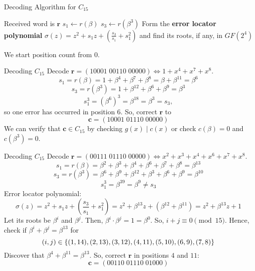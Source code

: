 \begin{algbox}
    \begin{algorithm}[H]
        \DontPrintSemicolon{}
        \caption{Decoding Algorithm for $ C_{15} $}
        Received word is $ \bm{r} $\;
        $ s_1\gets r(\beta) $\;
        $ s_3\gets r(\beta^3) $\;
         {
        }
         {
         {
        }
        }
         {
            \Return{}
        }
        Form the \textbf{error locator polynomial}
        $ \sigma(z)=z^2+s_1z+\left( \frac{s_3}{s_1} +s_1^2 \right) $ and find its
        roots, if any, in $ GF(2^4) $\;
         {
        }
        \Return{}
    \end{algorithm}
\end{algbox}

\begin{Remark}{}{}
    We start position count from $ 0 $.
\end{Remark}


\begin{Example}{Decoding $ C_{15} $}{}
    Decode $ \bm{r}=(10001\; 00110\; 00000)\iff 1+x^4+x^7+x^8 $.
    \[ s_1=r(\beta)=1+\beta^4+\beta^7+\beta^8=\beta+\beta^{11}=\beta^6 \]
    \[ s_3=r(\beta^3)=1+\beta^{12}+\beta^{6}+\beta^9=\beta^3 \]
    \[ s_1^3=(\beta^6)^3=\beta^{18}=\beta^3=s_3, \]
    so one error has occurred in position $ 6 $. So, correct $ \bm{r} $ to
    \[ \bm{c}=(10001\; 01110\; 00000) \]
    We can verify that $ \bm{c}\in C_{15} $ by checking $ g(x)\mid c(x) $
    or check $ c(\beta)=0 $ and $ c(\beta^3)=0 $.
\end{Example}



\begin{Example}{Decoding $ C_{15} $}{}
    Decode $ \bm{r}=(00111\; 01110\; 00000)\iff x^2+x^3+x^4+x^6+x^7+x^8 $.
    \[ s_1=r(\beta)=\beta^2+\beta^3+\beta^4+\beta^6+\beta^7+\beta^8=\beta^{13} \]
    \[ s_3=r(\beta^3)=\beta^6+\beta^9+\beta^{12}+\beta^3+\beta^6+\beta^9=\beta^{10} \]
    \[ s_1^3=\beta^{39}=\beta^9\neq s_3 \]
    Error locator polynomial:
    \[ \sigma(z)=z^2+s_1z+\left(\frac{s_3}{s_1}+s_1^2 \right)
        =z^2+\beta^{13}z+(\beta^{12}+\beta^{11})=z^2+\beta^{13}z+1 \]
    Let its roots be $ \beta^i $ and $ \beta^j $. Then, $ \beta^i\cdot \beta^j=1=
        \beta^0 $. So, $ i+j\equiv 0\pmod{15} $. Hence, check if $ \beta^i+\beta^j=\beta^{13} $
    for
    \[ (i,j)\in \{(1,14),(2,13),(3,12),(4,11),(5,10),(6,9),(7,8)\} \]
    Discover that $ \beta^4+\beta^{11}=\beta^{13} $. So, correct $ \bm{r} $
    in positions $ 4 $ and $ 11 $:
    \[ \bm{c}=(00110\; 01110\; 01000) \]
\end{Example}



